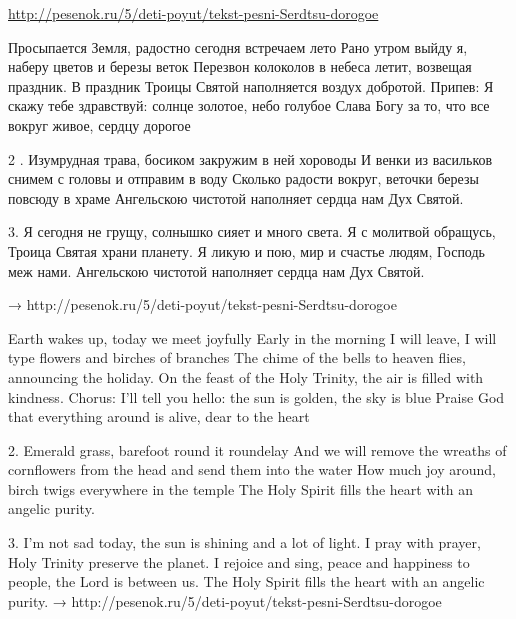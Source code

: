  
 
 
 
 

\url{http://pesenok.ru/5/deti-poyut/tekst-pesni-Serdtsu-dorogoe}

Просыпается Земля, радостно сегодня встречаем лето
Рано утром выйду я, наберу цветов и березы веток
Перезвон колоколов в небеса летит, возвещая праздник.
В праздник Троицы Святой наполняется воздух добротой.
Припев:
Я скажу тебе здравствуй: солнце золотое, небо голубое
Слава Богу за то, что все вокруг живое, сердцу дорогое

2 . Изумрудная трава, босиком закружим в ней хороводы
И венки из васильков снимем с головы и отправим в воду
Сколько радости вокруг, веточки березы повсюду в храме
Ангельскою чистотой наполняет сердца нам Дух Святой.

3. Я сегодня не грущу, солнышко сияет и много света. Я с молитвой обращусь,
Троица Святая храни планету. Я ликую и пою, мир и счастье людям, Господь меж
нами. Ангельскою чистотой наполняет сердца нам Дух Святой.

→ http://pesenok.ru/5/deti-poyut/tekst-pesni-Serdtsu-dorogoe 

 Earth wakes up, today we meet joyfully
Early in the morning I will leave, I will type flowers and birches of branches
The chime of the bells to heaven flies, announcing the holiday.
On the feast of the Holy Trinity, the air is filled with kindness.
Chorus:
I'll tell you hello: the sun is golden, the sky is blue
Praise God that everything around is alive, dear to the heart

2. Emerald grass, barefoot round it roundelay
And we will remove the wreaths of cornflowers from the head and send them into the water
How much joy around, birch twigs everywhere in the temple
The Holy Spirit fills the heart with an angelic purity.

3. I'm not sad today, the sun is shining and a lot of light. I pray with prayer, Holy Trinity preserve the planet. I rejoice and sing, peace and happiness to people, the Lord is between us. The Holy Spirit fills the heart with an angelic purity.
→ http://pesenok.ru/5/deti-poyut/tekst-pesni-Serdtsu-dorogoe 
